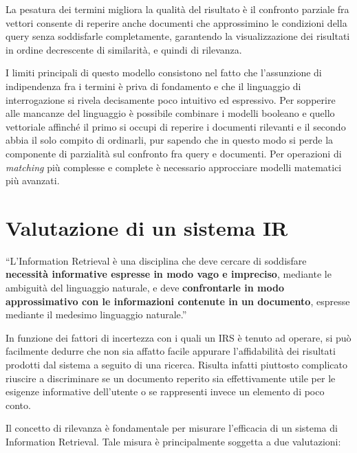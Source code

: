 \vspace{1em}

La pesatura dei termini migliora la qualità del risultato è il confronto parziale fra vettori consente di reperire anche documenti che approssimino le condizioni della query senza soddisfarle completamente, garantendo la visualizzazione dei risultati in ordine decrescente di similarità, e quindi di rilevanza.

I limiti principali di questo modello consistono nel fatto che l’assunzione di indipendenza fra i termini è priva di fondamento e che il linguaggio di interrogazione si rivela decisamente poco intuitivo ed espressivo. Per sopperire alle mancanze del linguaggio è possibile combinare i modelli booleano e quello vettoriale affinché il primo si occupi di reperire i documenti rilevanti e il secondo abbia il solo compito di ordinarli, pur sapendo che in questo modo si perde la componente di parzialità sul confronto fra query e documenti. Per operazioni di \textit{matching} più complesse e complete è necessario approcciare modelli matematici più avanzati.



\section{Valutazione di un sistema IR}
\label{sec:IRSrating}

 “L’Information Retrieval è una disciplina che deve cercare di soddisfare \textbf{necessità informative espresse in modo vago e impreciso}, mediante le ambiguità del linguaggio naturale, e deve \textbf{confrontarle in modo approssimativo con le informazioni contenute in un documento}, espresse mediante il medesimo linguaggio naturale.”

\vspace{1em}

In funzione dei fattori di incertezza con i quali un IRS è tenuto ad operare, si può facilmente dedurre che non sia affatto facile appurare l'affidabilità dei risultati prodotti dal sistema a seguito di una ricerca. Risulta infatti piuttosto complicato riuscire a discriminare se un documento reperito sia effettivamente utile per le esigenze informative dell’utente o se rappresenti invece un elemento di poco conto. 

\vspace{1em}

Il concetto di rilevanza è fondamentale per misurare l’efficacia di un sistema di Information Retrieval. Tale misura è principalmente soggetta a due valutazioni:

